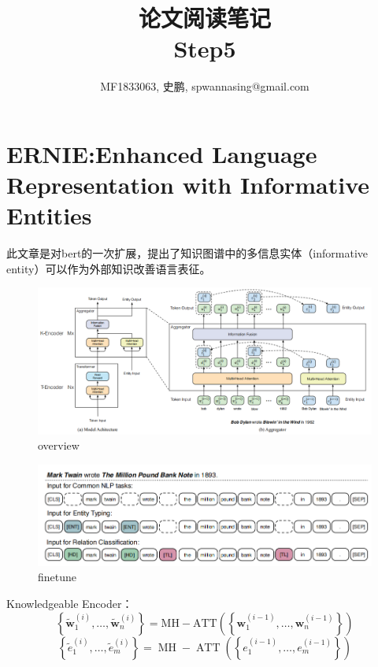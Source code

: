 \documentclass[a4paper,UTF8]{article}
\numberwithin{equation}{section}
\begin{document}
\title{论文阅读笔记\\
Step5}
\author{MF1833063, 史鹏, spwannasing@gmail.com}
\maketitle

\newpage
\section{ERNIE:Enhanced Language Representation with Informative Entities}
此文章是对bert的一次扩展，提出了知识图谱中的多信息实体（informative entity）可以作为外部知识改善语言表征。
\begin{figure}[H]
	\centering
	\includegraphics[width=\textwidth]{1-1.png}
	\caption{overview}
\end{figure}
\begin{figure}[H]
	\centering
	\includegraphics[width=\textwidth]{1-2.png}
	\caption{finetune}
\end{figure}
Knowledgeable Encoder：
\begin{equation}
	\left\{\tilde{\boldsymbol{w}}_{1}^{(i)}, \ldots, \tilde{\boldsymbol{w}}_{n}^{(i)}\right\}=\mathrm{MH}-\mathrm{A} \mathrm{T} \mathrm{T}\left(\left\{\boldsymbol{w}_{1}^{(i-1)}, \ldots, \boldsymbol{w}_{n}^{(i-1)}\right\}\right)
	\end{equation}
	\begin{equation}
		\left\{\tilde{e}_{1}^{(i)}, \ldots, \tilde{e}_{m}^{(i)}\right\}=\operatorname{MH}-\operatorname{ATT}\left(\left\{e_{1}^{(i-1)}, \ldots, e_{m}^{(i-1)}\right\}\right)
		\end{equation}
\end{document}
